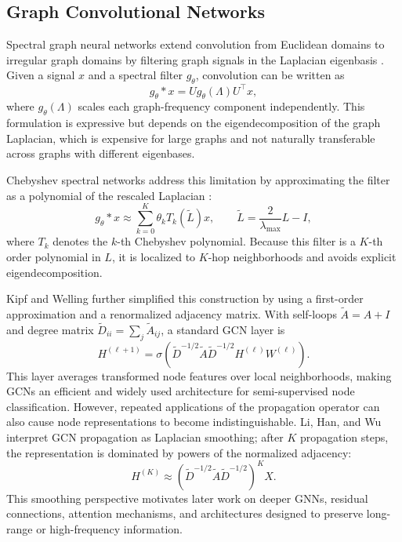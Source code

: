 \documentclass[11pt]{article}
\begin{document}
\subsection{Graph Convolutional Networks}
Spectral graph neural networks extend convolution from Euclidean domains to irregular graph domains by filtering graph signals in the Laplacian eigenbasis \cite{bruna2014spectral,defferrard2016convolutional,kipf2017semi}. Given a signal $x$ and a spectral filter $g_\theta$, convolution can be written as
\[
    g_\theta * x
    = U g_\theta(\Lambda) U^\top x,
\]
where $g_\theta(\Lambda)$ scales each graph-frequency component independently. This formulation is expressive but depends on the eigendecomposition of the graph Laplacian, which is expensive for large graphs and not naturally transferable across graphs with different eigenbases.

Chebyshev spectral networks address this limitation by approximating the filter as a polynomial of the rescaled Laplacian \cite{defferrard2016convolutional}:
\[
    g_\theta * x
    \approx \sum_{k=0}^{K} \theta_k T_k(\widetilde{L})x,
    \qquad
    \widetilde{L} = \frac{2}{\lambda_{\max}}L - I,
\]
where $T_k$ denotes the $k$-th Chebyshev polynomial. Because this filter is a $K$-th order polynomial in $L$, it is localized to $K$-hop neighborhoods and avoids explicit eigendecomposition.

Kipf and Welling \cite{kipf2017semi} further simplified this construction by using a first-order approximation and a renormalized adjacency matrix. With self-loops $\widetilde{A}=A+I$ and degree matrix $\widetilde{D}_{ii}=\sum_j \widetilde{A}_{ij}$, a standard GCN layer is
\[
    H^{(\ell+1)}
    = \sigma\!\left(
        \widetilde{D}^{-1/2}\widetilde{A}\widetilde{D}^{-1/2}
        H^{(\ell)}W^{(\ell)}
      \right).
\]
This layer averages transformed node features over local neighborhoods, making GCNs an efficient and widely used architecture for semi-supervised node classification. However, repeated applications of the propagation operator can also cause node representations to become indistinguishable. Li, Han, and Wu \cite{li2018deeper} interpret GCN propagation as Laplacian smoothing; after $K$ propagation steps, the representation is dominated by powers of the normalized adjacency:
\[
    H^{(K)} \approx
    \left(\widetilde{D}^{-1/2}\widetilde{A}\widetilde{D}^{-1/2}\right)^K X.
\]
This smoothing perspective motivates later work on deeper GNNs, residual connections, attention mechanisms, and architectures designed to preserve long-range or high-frequency information.
\end{document}

